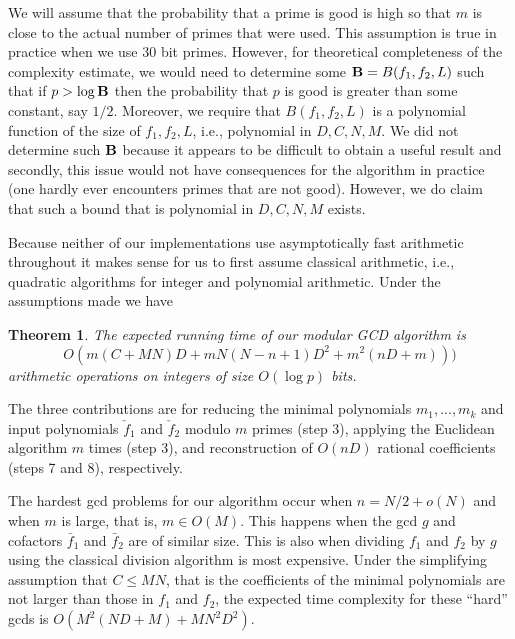 \documentclass[10pt]{article}
\newtheorem{theorem}{Theorem}
\begin{document}
We will assume that the probability that a prime is good is high
so that $m$ is close to the actual number of primes that were used.
This assumption is true in practice when we use 30 bit primes.
However, for theoretical completeness of the complexity estimate,
we would need to determine some ${\bf B} = B(f_1,f_2,L)$ such that
if $p > \log \bf B$ then the probability that $p$ is good is greater
than some constant, say $1/2$.
Moreover, we require that $B(f_1,f_2,L)$ is a polynomial function
of the size of $f_1,f_2,L$, i.e., polynomial in $D,C,N,M$.
We did not determine such $\bf B$ because it appears to be difficult
to obtain a useful result and secondly, this issue would
not have consequences for the algorithm in practice (one hardly ever
encounters primes that are not good).
However, we do claim that such a bound that is
polynomial in $D, C, N, M$ exists.


Because neither of our implementations use asymptotically
fast arithmetic throughout it makes sense for us to first assume
classical arithmetic, i.e., quadratic algorithms for integer
and polynomial arithmetic.  Under the assumptions made we have
\begin{theorem}
\label{theorem2}
The expected running time of our modular GCD algorithm is
\[
   O( m (C + M N) D + m N (N-n+1) D^2 + m^2 (n D + m) ) )
\]
arithmetic operations on integers of size $O( \log p )$ bits.
\end{theorem}
The three contributions are for reducing the minimal polynomials $m_1, ..., m_k$
and input polynomials $\check f_1$ and $\check f_2$ modulo $m$ primes (step 3),
applying the Euclidean algorithm $m$ times (step 3),
and reconstruction of $O(n D)$ rational coefficients (steps 7 and 8),
respectively.

The hardest gcd problems for our algorithm occur when $n = N/2 +
o(N)$ and when $m$ is large, that is, $m \in O(M).$  This happens
when the gcd $g$ and cofactors $\bar f_1$ and $\bar f_2$ are of
similar size. This is also when dividing $f_1$ and $f_2$ by $g$
using the classical division algorithm is most expensive. Under the
simplifying assumption that $C \le M N$, that is the coefficients of
the minimal polynomials are not larger than those in $f_1$ and
$f_2$, the expected time complexity for these ``hard'' gcds is $O(
M^2 (N D + M) + M N^2 D^2 ).$

 
\end{document}
